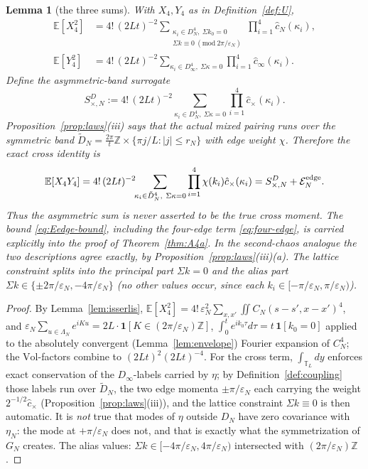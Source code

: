 \documentclass[11pt,a4paper]{article}
\theoremstyle{plain}
\newtheorem{lemma}[theorem]{Lemma}
\theoremstyle{definition}
\newcommand{\Z}{\mathbb{Z}}
\newcommand{\T}{\mathbb{T}}
\newcommand{\E}{\mathbb{E}}
\newcommand{\eps}{\varepsilon}
\begin{document}
\begin{lemma}[the three sums]\label{lem:threesums}
With $X_4,Y_4$ as in Definition~\ref{def:U},
\begin{align}
 \E[X_4^2]&=4!\,(2Lt)^{-2}
 \sum_{\substack{\kappa_i\in D_N^4,\ \Sigma k_0=0\\
 \Sigma k\equiv0\ (\mathrm{mod}\ 2\pi/\eps_N)}}
 \prod_{i=1}^4\hat c_N(\kappa_i),
 \label{eq:XX}\\
 \E[Y_4^2]&=4!\,(2Lt)^{-2}
 \sum_{\kappa_i\in D_\infty^4,\ \Sigma\kappa=0}
 \prod_{i=1}^4\hat c_\infty(\kappa_i).
 \nonumber
\end{align}
Define the asymmetric-band surrogate
\[
 S_{\times,N}^{D}:=4!\,(2Lt)^{-2}
 \sum_{\kappa_i\in D_N^4,\ \Sigma\kappa=0}
 \prod_{i=1}^4\hat c_\times(\kappa_i).
\]
Proposition~\ref{prop:laws}(iii) says that the actual mixed pairing runs over
the \emph{symmetric} band
$\tilde D_N=\tfrac{2\pi}t\Z\times\{\pi j/L:|j|\le r_N\}$ with edge weight
$\chi$.  Therefore the exact cross identity is
\[
 \E[X_4Y_4]
 =4!\,(2Lt)^{-2}\!\!\sum_{\kappa_i\in\tilde D_N^4,\ \Sigma\kappa=0}
 \prod_{i=1}^4\chi(k_i)\hat c_\times(\kappa_i)
 =S_{\times,N}^{D}+\mathcal E_N^{\rm edge}.
\]
Thus the asymmetric sum is never asserted to be the true cross moment.  The bound
\eqref{eq:Eedge-bound}, including the four-edge term
\eqref{eq:four-edge}, is carried explicitly into the proof of
Theorem~\ref{thm:A4a}. In the second-chaos analogue
the two descriptions agree \emph{exactly}, by Proposition~\ref{prop:laws}(iii)(a).
The lattice constraint splits into the \emph{principal} part $\Sigma k=0$ and
the \emph{alias} part $\Sigma k\in\{\pm2\pi/\eps_N,-4\pi/\eps_N\}$
(no other values occur, since each $k_i\in[-\pi/\eps_N,\pi/\eps_N)$).
\end{lemma}

\begin{proof}
By Lemma~\ref{lem:isserlis}, $\E[X_4^2]=4!\,\eps_N^2\sum_{x,x'}
\iint C_N(s-s',x-x')^4$, and
$\eps_N\sum_{u\in\Lambda_N}e^{iKu}=2L\cdot\mathbf 1[K\in(2\pi/\eps_N)\Z]$,
$\int_0^te^{ik_0\tau}d\tau=t\,\mathbf 1[k_0=0]$ applied to the absolutely
convergent (Lemma~\ref{lem:envelope}) Fourier expansion of $C_N^4$; the
$\mathrm{Vol}$-factors combine to $(2Lt)^{2}(2Lt)^{-4}$. For the cross term,
$\int_{\T_L}dy$ enforces exact conservation of the $D_\infty$-labels carried by
$\eta$; by Definition~\ref{def:coupling} those labels run over $\tilde D_N$, the two
edge momenta $\pm\pi/\eps_N$ each carrying the weight $2^{-1/2}\hat c_\times$
(Proposition~\ref{prop:laws}(iii)), and the lattice constraint $\Sigma k\equiv0$ is
then automatic. It is \emph{not} true that modes of $\eta$ outside $D_N$ have zero
covariance with $\eta_N$: the mode at $+\pi/\eps_N$ does not, and that is exactly what
the symmetrization of $G_N$ creates. The alias values:
$\Sigma k\in[-4\pi/\eps_N,4\pi/\eps_N)$ intersected with
$(2\pi/\eps_N)\Z$.
\end{proof}
\end{document}
